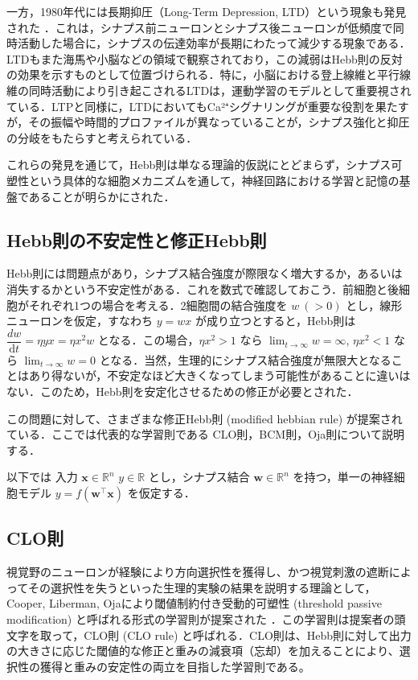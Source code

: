\documentclass[titlepage]{ltjsbook}
\begin{document}
一方，1980年代には長期抑圧（Long-Term Depression, LTD）という現象も発見された \citep{Dudek1992-nz}．これは，シナプス前ニューロンとシナプス後ニューロンが低頻度で同時活動した場合に，シナプスの伝達効率が長期にわたって減少する現象である．LTDもまた海馬や小脳などの領域で観察されており，この減弱はHebb則の反対の効果を示すものとして位置づけられる．特に，小脳における登上線維と平行線維の同時活動により引き起こされるLTDは，運動学習のモデルとして重要視されている．LTPと同様に，LTDにおいてもCa²⁺シグナリングが重要な役割を果たすが，その振幅や時間的プロファイルが異なっていることが，シナプス強化と抑圧の分岐をもたらすと考えられている．

これらの発見を通じて，Hebb則は単なる理論的仮説にとどまらず，シナプス可塑性という具体的な細胞メカニズムを通して，神経回路における学習と記憶の基盤であることが明らかにされた．

\subsection{Hebb則の不安定性と修正Hebb則}
Hebb則には問題点があり，シナプス結合強度が際限なく増大するか，あるいは消失するかという不安定性がある．これを数式で確認しておこう．前細胞と後細胞がそれぞれ1つの場合を考える．2細胞間の結合強度を $w\ (>0)$ とし，線形ニューロンを仮定，すなわち $y=wx$ が成り立つとすると，Hebb則は $\dfrac{dw}{\mathrm{d}t}=\eta yx=\eta x^2w$ となる．この場合，$\eta x^2>1$ なら $\lim_{t\to\infty} w= \infty$, $\eta x^2<1$ なら $\lim_{t\to\infty} w= 0$ となる．当然，生理的にシナプス結合強度が無限大となることはあり得ないが，不安定なほど大きくなってしまう可能性があることに違いはない．このため，Hebb則を安定化させるための修正が必要とされた．

この問題に対して、さまざまな修正Hebb則 (modified hebbian rule) が提案されている．ここでは代表的な学習則である CLO則，BCM則，Oja則について説明する．

以下では 入力 $\mathbf{x}\in \mathbb{R}^n$ $y\in \mathbb{R}$ とし，シナプス結合 $\mathbf{w}\in \mathbb{R}^n$ を持つ，単一の神経細胞モデル $y = f(\mathbf{w}^\top \mathbf{x})$ を仮定する．

\subsection{CLO則}
視覚野のニューロンが経験により方向選択性を獲得し、かつ視覚刺激の遮断によってその選択性を失うといった生理的実験の結果を説明する理論として，Cooper, Liberman, Ojaにより閾値制約付き受動的可塑性 (threshold passive modification) と呼ばれる形式の学習則が提案された \citep{Cooper1979-wz}．この学習則は提案者の頭文字を取って，CLO則 (CLO rule) と呼ばれる．CLO則は、Hebb則に対して出力の大きさに応じた閾値的な修正と重みの減衰項（忘却）を加えることにより、選択性の獲得と重みの安定性の両立を目指した学習則である。
\end{document}
